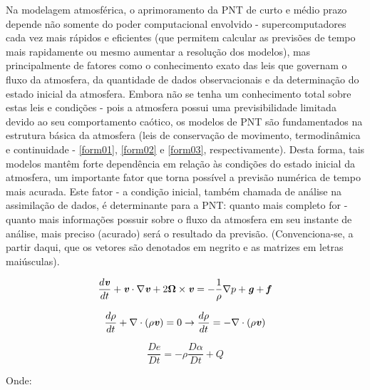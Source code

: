 Na modelagem atmosférica, o aprimoramento da PNT de curto e médio prazo depende não somente do poder computacional envolvido - supercomputadores cada vez mais rápidos e eficientes (que permitem calcular as previsões de tempo mais rapidamente ou mesmo aumentar a resolução dos modelos), mas principalmente de fatores como o conhecimento exato das leis que governam o fluxo da atmosfera, da quantidade de dados observacionais e da determinação do estado inicial da atmosfera.  Embora não se tenha um conhecimento total sobre estas leis e condições - pois a atmosfera possui uma previsibilidade limitada devido ao seu comportamento caótico, os modelos de PNT são fundamentados na estrutura básica da atmosfera (leis de conservação de movimento, termodinâmica e continuidade - \autoref{form01}, \autoref{form02} e \autoref{form03}, respectivamente). Desta forma, tais modelos mantêm forte dependência em relação às condições do estado inicial da atmosfera, um importante fator que torna possível a previsão numérica de tempo mais acurada. Este fator - a condição inicial, também chamada de análise na assimilação de dados, é determinante para a PNT: quanto mais completo for - quanto mais informações possuir sobre o fluxo da atmosfera em seu instante de análise, mais preciso (acurado) será o resultado da previsão. (Convenciona-se, a partir daqui, que os vetores são denotados em negrito e as matrizes em letras maiúsculas).

\begin{equation}
\frac{d\textbf{\textit{v}}}{dt}+\textbf{\textit{v}}\cdot\nabla\textbf{\textit{v}}+2\mathbf{\Omega}\times\textbf{\textit{v}}=-\frac{1}{\rho}\nabla{p}+\textbf{\textit{g}}+\textbf{\textit{f}}
\label{form01}
\end{equation}

\begin{equation}
\frac{d\rho}{dt}+\nabla\cdot(\rho\textbf{\textit{v}})=0\rightarrow\frac{d\rho}{dt}=-\nabla\cdot(\rho\textbf{\textit{v}})
\label{form02}
\end{equation}

\begin{equation}
\frac{D\textit{e}}{D\textit{t}}=-\rho\frac{D\alpha}{D\textit{t}}+\textit{Q}
\label{form03}
\end{equation}

Onde:

